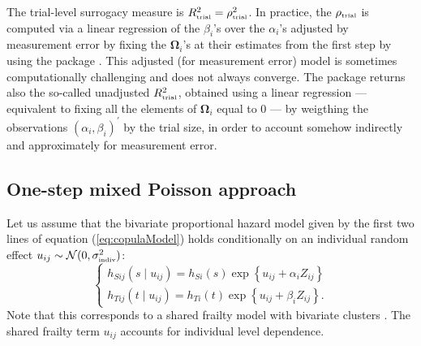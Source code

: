 \documentclass[article,shortnames, nojss]{jss}\usepackage[]{graphicx}\usepackage[]{color}
\begin{document}
The trial-level surrogacy measure is
  $R_\text{\tiny trial}^2 = \rho_\text{\tiny trial}^2$.
In practice, the $\rho_\text{\tiny trial}$ is computed
  via a linear regression of the $\beta_i$'s over the $\alpha_i$'s
  adjusted by measurement error by fixing the $\bm\Omega_i$'s at their estimates
  from the first step \citep{vanHouwelingenEtal02}
  by using the  package \citep{GasparriniEtal12, R:mvmeta}.
This adjusted (for measurement error) model is sometimes computationally challenging
  and does not always converge.
The  package returns also the so-called
  unadjusted $R_\text{\tiny trial}^2$,
  obtained using a linear regression ---
  equivalent to fixing all the elements of $\bm\Omega_i$ equal to 0 ---
  by weigthing the observations $(\alpha_i, \beta_i)^\prime$ by the trial size,
  in order to account somehow indirectly and approximately for measurement error.



\subsection{One-step mixed Poisson approach}

Let us assume that the bivariate proportional hazard model given by the first
  two lines of equation (\ref{eq:copulaModel}) holds conditionally
  on an individual random effect
  $u_{ij} \sim \mathcal N(0, \sigma^2_\text{\tiny indiv})$:
  \begin{equation}
    \begin{cases}
      h_{Sij}(s\mid u_{ij}) = h_{S i}(s)
      \exp\left\{u_{ij} + \alpha_i Z_{ij} \right\}\\
      h_{Tij}(t\mid u_{ij}) = h_{T i}(t)
      \exp\left\{u_{ij} + \beta_i Z_{ij}\right\}.
    \end{cases}
    \label{eq:biHaz}
  \end{equation}
Note that this corresponds to a  shared frailty model with 
  bivariate clusters \citep{DuchateauJanssen08}.
The shared frailty term $u_{ij}$ accounts for individual level dependence.
\end{document}
